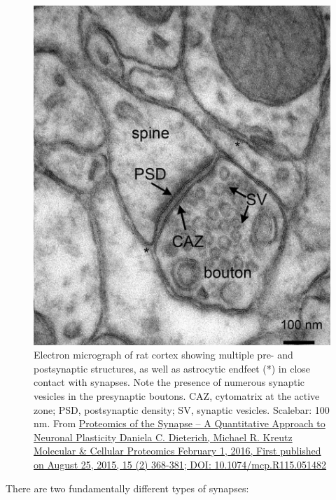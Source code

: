 \begin{figure}

{\centering \includegraphics[width=0.7\linewidth]{./figures/synapse/synapse_electronmicrograph} 

}

\caption{Electron micrograph of rat cortex showing multiple pre- and postsynaptic structures, as well as astrocytic endfeet (*) in close contact with synapses. Note the presence of numerous synaptic vesicles in the presynaptic boutons. CAZ, cytomatrix at the active zone; PSD, postsynaptic density; SV, synaptic vesicles. Scalebar: 100 nm. From \href{https://doi.org/10.1074/mcp.R115.051482}{Proteomics of the Synapse -- A Quantitative Approach to Neuronal Plasticity Daniela C. Dieterich, Michael R. Kreutz Molecular \& Cellular Proteomics February 1, 2016, First published on August 25, 2015, 15 (2) 368-381; DOI: 10.1074/mcp.R115.051482}}\label{fig:electronsynapse}
\end{figure}

There are two fundamentally different types of synapses:

